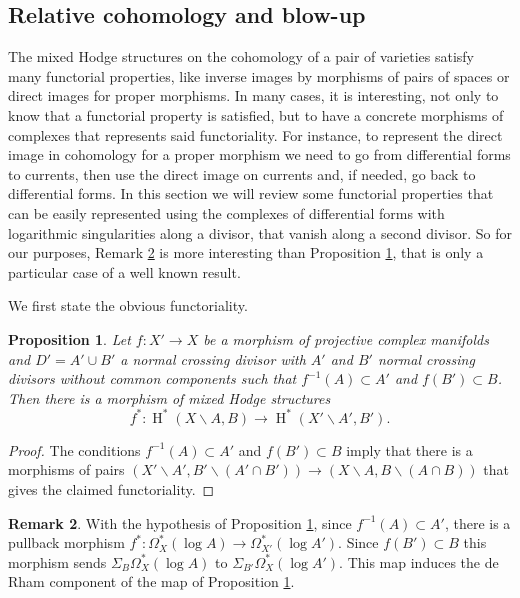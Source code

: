 \documentclass[11pt,a4paper]{amsart}
\DeclareMathOperator{\rH}{H}
\numberwithin{equation}{section}
\theoremstyle{plain}
\newtheorem{prop}{Proposition}[section]
\theoremstyle{definition}
\newtheorem{rmk}[prop]{Remark}
\begin{document}
\subsection{Relative cohomology and blow-up}
\label{sec:relat-cohom-blow}
The mixed Hodge structures on the cohomology of a pair of varieties
satisfy many functorial properties, like inverse images by morphisms
of pairs of spaces or direct images for proper morphisms. In many
cases, it is interesting, not only to know that a functorial property
is satisfied, but to have a concrete morphisms of complexes that
represents said functoriality. For instance, to represent the direct
image in cohomology for a proper morphism we need to go from
differential forms to  currents, then use the direct image on currents
and, if needed, go back to differential forms. In this section we will
review some functorial properties that can be easily represented using 
the complexes of  differential forms  with logarithmic singularities
along a divisor, that vanish along a second divisor. So for our
purposes, Remark \ref{rem:6} is more interesting than 
Proposition \ref{prop:10}, that is only a particular case of a well
known result.  

We first state the obvious functoriality.

\begin{prop}\label{prop:10}
  Let $f\colon X'\to X$ be a morphism of projective complex manifolds
  and $D'=A'\cup B'$ a normal crossing divisor with $A'$ and $B'$
  normal crossing divisors without common components such that
  $f^{-1}(A)\subset A'$ and $f(B')\subset B$. Then there is a morphism of mixed
  Hodge structures
  \begin{displaymath}
    f^{\ast}\colon \rH^{\ast}(X\smallsetminus A,B )\longrightarrow
    \rH^{\ast}(X'\smallsetminus A',B').
  \end{displaymath}
\end{prop}
\begin{proof}
  The conditions $f^{-1}(A)\subset A'$ and $f(B')\subset B$ imply that
  there is a  morphisms of pairs $(X'\smallsetminus A',B'\smallsetminus(A'\cap
  B'))\to
  (X\smallsetminus A,B\smallsetminus(A\cap
  B))$ that gives the claimed functoriality.
\end{proof}
\begin{rmk}\label{rem:6}
  With the hypothesis of Proposition \ref{prop:10}, since
  $f^{-1}(A)\subset A'$, there is a pullback
  morphism $f^{\ast}\colon \Omega ^{\ast}_{X}(\log A)\to \Omega
  ^{\ast}_{X'}(\log A')$. Since $f(B')\subset B$ this morphism sends
  $\Sigma _B\Omega ^{\ast}_{X}(\log A)$ to $\Sigma _{B'}\Omega
  ^{\ast}_{X}(\log A')$. This map induces 
  the de Rham component of the map of Proposition \ref{prop:10}.
\end{rmk}
\end{document}
